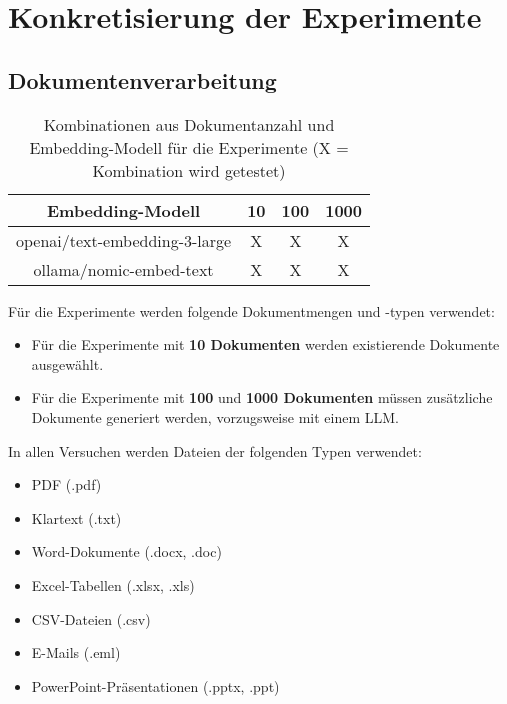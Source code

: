 \section{Konkretisierung der Experimente}

\subsection{Dokumentenverarbeitung}
\begin{table}[htbp]
    \centering
    \begin{tabular}{|c|c|c|c|}
        \hline
        \textbf{Embedding-Modell} & \textbf{10} & \textbf{100} & \textbf{1000} \\
        \hline
        openai/text-embedding-3-large & X & X & X \\
        ollama/nomic-embed-text       & X & X & X \\
        \hline
    \end{tabular}
    \caption{Kombinationen aus Dokumentanzahl und Embedding-Modell für die Experimente (X = Kombination wird getestet)}
    \label{tab:dokument-erstellung}
\end{table}

Für die Experimente werden folgende Dokumentmengen und -typen verwendet:

\begin{itemize}
    \item Für die Experimente mit \textbf{10 Dokumenten} werden existierende Dokumente ausgewählt.
    \item Für die Experimente mit \textbf{100} und \textbf{1000 Dokumenten} müssen zusätzliche Dokumente generiert werden, vorzugsweise mit einem LLM.
\end{itemize}

\noindent
In allen Versuchen werden Dateien der folgenden Typen verwendet:

\begin{itemize}
    \item PDF (.pdf)
    \item Klartext (.txt)
    \item Word-Dokumente (.docx, .doc)
    \item Excel-Tabellen (.xlsx, .xls)
    \item CSV-Dateien (.csv)
    \item E-Mails (.eml)
    \item PowerPoint-Präsentationen (.pptx, .ppt)
\end{itemize}

